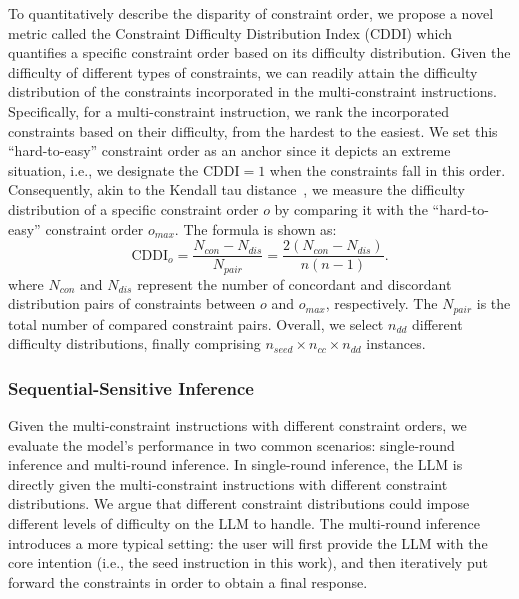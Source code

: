 To quantitatively describe the disparity of constraint order, we propose a novel metric called the Constraint Difficulty Distribution Index (CDDI) which quantifies a specific constraint order based on its difficulty distribution. Given the difficulty of different types of constraints, we can readily attain the difficulty distribution of the constraints incorporated in the multi-constraint instructions. Specifically, for a multi-constraint instruction, we rank the incorporated constraints based on their difficulty, from the hardest to the easiest. We set this “hard-to-easy” constraint order as an anchor since it depicts an extreme situation, i.e., we designate the $\text{CDDI}=1$ when the constraints fall in this order. Consequently, akin to the Kendall tau distance~\cite{cicirello2020kendall}, we measure the difficulty distribution of a specific constraint order $o$ by comparing it with the ``hard-to-easy'' constraint order $o_{max}$. The formula is shown as:
\begin{equation}
    \label{eq4}
    \text{CDDI}_{o} = \frac{N_{con}-N_{dis}}{N_{pair}} = \frac{2(N_{con}-N_{dis})}{n(n-1)}.
\end{equation}
where $N_{con}$ and $N_{dis}$ represent the number of concordant and discordant distribution pairs of constraints between $o$ and $o_{max}$, respectively. The $N_{pair}$ is the total number of compared constraint pairs. Overall, we select $n_{dd}$ different difficulty distributions, finally comprising $n_{seed}\times n_{cc}\times n_{dd}$ instances.







\subsubsection{Sequential-Sensitive Inference}
Given the multi-constraint instructions with different constraint orders, we evaluate the model's performance in two common scenarios: single-round inference and multi-round inference. In single-round inference, the LLM is directly given the multi-constraint instructions with different constraint distributions. We argue that different constraint distributions could impose different levels of difficulty on the LLM to handle. The multi-round inference introduces a more typical setting: the user will first provide the LLM with the core intention (i.e., the seed instruction in this work), and then iteratively put forward the constraints in order to obtain a final response.

